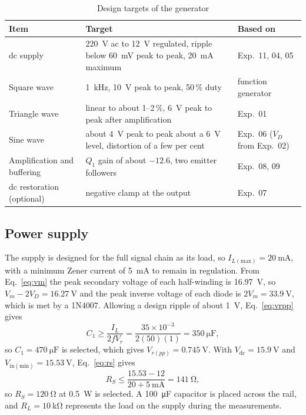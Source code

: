 \documentclass[12pt,a4paper]{article}
\begin{document}
	\begin{table}[H]
		\centering
		\caption{Design targets of the generator}
		\label{tab:targets}
		\renewcommand{\arraystretch}{1.25}
		\begin{tabularx}{\textwidth}{|l|X|l|}
			\hline
			\rowcolor{black!12}\textbf{Item} & \textbf{Target} & \textbf{Based on} \\
			\hline
			dc supply & \SI{220}{\volt} ac to \SI{12}{\volt} regulated, ripple below \SI{60}{\milli\volt} peak to peak, \SI{20}{\milli\ampere} maximum & Exp.~11, 04, 05 \\
			\hline
			Square wave & \SI{1}{\kilo\hertz}, \SI{10}{\volt} peak to peak, 50\,\% duty & function generator \\
			\hline
			Triangle wave & linear to about 1--2\,\%, \SI{6}{\volt} peak to peak after amplification & Exp.~01 \\
			\hline
			Sine wave & about \SI{4}{\volt} peak to peak about a \SI{6}{\volt} level, distortion of a few per cent & Exp.~06 ($V_D$ from Exp.~02) \\
			\hline
			Amplification and buffering & $Q_1$ gain of about $-12.6$, two emitter followers & Exp.~08, 09 \\
			\hline
			dc restoration (optional) & negative clamp at the output & Exp.~07 \\
			\hline
		\end{tabularx}
	\end{table}

	\subsection{Power supply}
	The supply is designed for the full signal chain as its load, so $I_{L(\mathrm{max})}=\SI{20}{\milli\ampere}$, with a minimum Zener current of \SI{5}{\milli\ampere} to remain in regulation. From Eq.~\eqref{eq:vm} the peak secondary voltage of each half-winding is \SI{16.97}{\volt}, so $V_m-2V_D=\SI{16.27}{\volt}$ and the peak inverse voltage of each diode is $2V_m=\SI{33.9}{\volt}$, which is met by a 1N4007. Allowing a design ripple of about \SI{1}{\volt}, Eq.~\eqref{eq:vrpp} gives
	\begin{equation}
		C_1\ge\frac{I_L}{2fV_r}=\frac{35\times10^{-3}}{2(50)(1)}=\SI{350}{\micro\farad},
		\label{eq:c1}
	\end{equation}
	so $C_1=\SI{470}{\micro\farad}$ is selected, which gives $V_{r(pp)}=\SI{0.745}{\volt}$. With $V_{\mathrm{dc}}=\SI{15.9}{\volt}$ and $V_{\mathrm{in(min)}}=\SI{15.53}{\volt}$, Eq.~\eqref{eq:rs} gives
	\begin{equation}
		R_S\le\frac{15.53-12}{20+5\ \mathrm{mA}}=\SI{141}{\ohm},
		\label{eq:rs-calc}
	\end{equation}
	so $R_S=\SI{120}{\ohm}$ at \SI{0.5}{\watt} is selected. A \SI{100}{\micro\farad} capacitor is placed across the rail, and $R_L=\SI{10}{\kilo\ohm}$ represents the load on the supply during the measurements.
\end{document}
